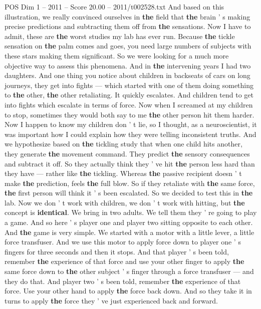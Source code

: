\begin{textsample}{POS Dim 1 – 2011 – Score 20.00 – 2011/t002528.txt}
And based on this illustration, we really convinced ourselves in \textbf{the} field that \textbf{the} brain ' s making precise predictions and subtracting them off from \textbf{the} sensations.
Now I have to admit, these are \textbf{the} worst studies my lab has ever run.
Because \textbf{the} tickle sensation on \textbf{the} palm comes and goes, you need large numbers of subjects with these stars making them significant.
So we were looking for a much more objective way to assess this phenomena.
And in \textbf{the} intervening years I had two daughters.
And one thing you notice about children in backseats of cars on long journeys, they get into fights — which started with one of them doing something to \textbf{the} other, \textbf{the} other retaliating.
It quickly escalates.
And children tend to get into fights which escalate in terms of force.
Now when I screamed at my children to stop, sometimes they would both say to me \textbf{the} other person hit them harder.
Now I happen to know my children don ' t lie, so I thought, as a neuroscientist, it was important how I could explain how they were telling inconsistent truths.
And we hypothesize based on \textbf{the} tickling study that when one child hits another, they generate \textbf{the} movement command.
They predict \textbf{the} sensory consequences and subtract it off.
So they actually think they ' ve hit \textbf{the} person less hard than they have — rather like \textbf{the} tickling.
Whereas \textbf{the} passive recipient doesn ' t make \textbf{the} prediction, feels \textbf{the} full blow.
So if they retaliate with \textbf{the} same force, \textbf{the} first person will think it ' s been escalated.
So we decided to test this in \textbf{the} lab.
Now we don ' t work with children, we don ' t work with hitting, but \textbf{the} concept is \textbf{identical}.
We bring in two adults.
We tell them they ' re going to play a game.
And so here ' s player one and player two sitting opposite to each other.
And \textbf{the} game is very simple.
We started with a motor with a little lever, a little force transfuser.
And we use this motor to apply force down to player one ' s fingers for three seconds and then it stops.
And that player ' s been told, remember \textbf{the} experience of that force and use your other finger to apply \textbf{the} same force down to \textbf{the} other subject ' s finger through a force transfuser — and they do that.
And player two ' s been told, remember \textbf{the} experience of that force.
Use your other hand to apply \textbf{the} force back down.
And so they take it in turns to apply \textbf{the} force they ' ve just experienced back and forward.

\end{textsample}
